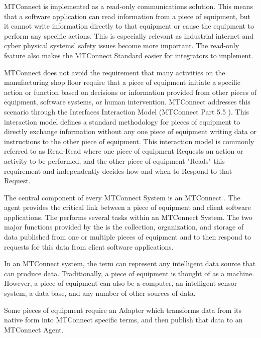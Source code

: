 MTConnect is implemented as a read-only communications solution.   This means that a software application can read information from a piece of equipment, but it cannot write information directly to that equipment or cause the equipment to perform any specific actions.  This is especially relevant as industrial internet and cyber physical systems' safety issues become more important.  The read-only feature also makes the MTConnect Standard easier for integrators to implement. 
 
MTConnect does not avoid the requirement that many activities on the manufacturing shop floor require that a piece of equipment initiate a specific action or function based on decisions or information provided from other pieces of equipment, software systems, or human intervention.   MTConnect addresses this scenario through the Interfaces Interaction Model (MTConnect Part 5.5 \cite{MTCPart5}).   This interaction model defines a standard methodology for pieces of equipment to directly exchange information without any one piece of equipment writing data or instructions to the other piece of equipment. This interaction model is commonly referred to as Read-Read where one piece of equipment Requests an action or activity to be performed, and the other piece of equipment "Reads" this requirement and independently decides how and when to Respond to that Request. 

The central component of every MTConnect System is an MTConnect .  The agent provides the critical link between a piece of equipment and client software applications. The  performs several tasks within an MTConnect System.   The two major functions provided by the  is the collection, organization, and storage of data published from one or multiple pieces of equipment and to then respond to requests for this data from client software applications. 


\FloatBarrier
 
In an MTConnect system, the term  can represent any intelligent data source that can produce data.  Traditionally, a piece of equipment is thought of as a machine. However, a piece of equipment can also be a computer, an intelligent sensor system, a data base, and any number of other sources of data. 
 
Some pieces of equipment require an Adapter which transforms data from its native form into MTConnect specific terms, and then publish that data to an MTConnect Agent.